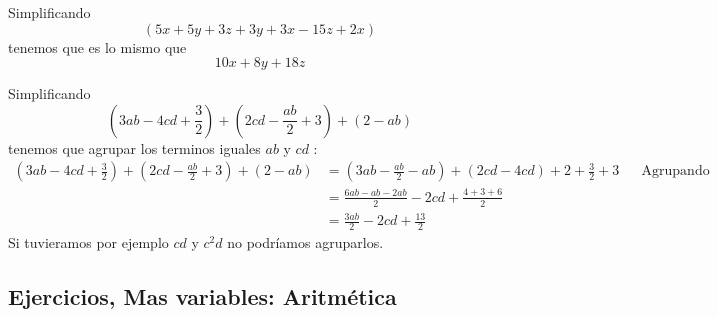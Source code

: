 \begin{ejemplo}
	Simplificando 
	\[
	(5x+5y+3z+3y+3x-15z+2x)
	\]
	tenemos que es lo mismo que
	\[
	10x + 8y +18z
	\]
\end{ejemplo}

\begin{ejemplo}
	Simplificando 
	\[
	\left(3ab-4cd+\frac{3}{2}\right) + \left(2cd - \frac{ab}{2} + 3\right) + (2-ab)
	\]
	tenemos que agrupar los terminos iguales $ab$ y $cd$ :
	\begin{align*}
	\left(3ab-4cd+\frac{3}{2}\right) + \left(2cd - \frac{ab}{2} + 3\right) + (2-ab) &= \left(3ab-\frac{ab}{2} -ab \right) + (2cd -4cd  ) +2 +\frac{3}{2}+ 3 && \text{Agrupando}\\
	&= \frac{6ab-ab-2ab}{2} -2cd + \frac{4+3+6}{2} \\
	&= \frac{3ab}{2}-2cd + \frac{13}{2}
	\end{align*}
	Si tuvieramos por ejemplo $cd$ y $c^2d$ no podríamos agruparlos.
\end{ejemplo}

\newpage
\begin{center}
	\vspace{-5mm}
	\subsection*{Ejercicios, Mas variables: Aritmética}\label{section_ejercicios_mas_variables}
\end{center}

